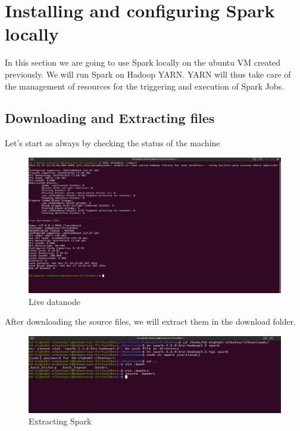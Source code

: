 \chapter{Installing and configuring Spark locally}
\par In this section we are going to use Spark locally on the ubuntu VM created previously. We will run
Spark on Hadoop YARN. YARN will thus take care of the management of resources for the triggering and
execution of Spark Jobs. 
\begin{spacing}{1.2}
\section{Downloading and Extracting files}

\par Let's start as always by checking the status of the machine
\\
\begin{figure}[!htb] 
\begin{center} 
\includegraphics[width=1\linewidth]{Big_Data/Spark/Spark Installation & Configuration/Live datanode} 
\end{center} 
\caption{Live datanode} 
\end{figure} 
\FloatBarrier



\par After downloading the source files, we will extract them in the download folder.
\\
\begin{figure}[!htb] 
\begin{center} 
\includegraphics[width=1\linewidth]{Big_Data/Spark/Spark Installation & Configuration/Extracting Spark} 
\end{center} 
\caption{Extracting Spark} 
\end{figure} 
\FloatBarrier


\end{spacing}
